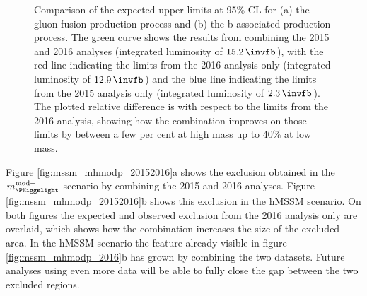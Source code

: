 \begin{figure}[h!]
\begin{center}
\end{center}
\caption[Comparison of the expected upper limits at 95\% CL for the 
gluon fusion and b-associated production process, comparing the 2015 and 2016 analyses with a combination.]{Comparison of the expected upper limits at 95\% \ac{CL} for (a) the gluon fusion production
process and (b) the b-associated production process. The green curve shows the results
from combining the 2015 and 2016 analyses (integrated luminosity of $15.2\,\invfb$),
with the red line indicating the limits from the 2016 analysis only (integrated luminosity of $12.9\,\invfb$)
and the blue line indicating the limits from the 2015 analysis only (integrated luminosity of $2.3\,\invfb$).
The plotted relative difference is with respect to the limits from the 2016 analysis, showing how the combination
improves on those limits by between a few per cent at high mass up to 40\% at low mass.}
\label{fig:mssm_results_combination_limits_comp}
\end{figure}

Figure \ref{fig:mssm_mhmodp_20152016}a shows the exclusion obtained in the $m_{\PHiggslight}^{\text{mod+}}$ 
scenario by combining the 2015 and 2016 analyses. Figure \ref{fig:mssm_mhmodp_20152016}b shows this exclusion
in the hMSSM scenario. On both figures the expected and observed exclusion from the
2016 analysis only are overlaid, which shows how the combination increases the
size of the excluded area. In the hMSSM scenario the feature already visible in figure \ref{fig:mssm_mhmodp_2016}b
has grown by combining the two datasets. Future analyses using even more data will be able to fully close
the gap between the two excluded regions.

